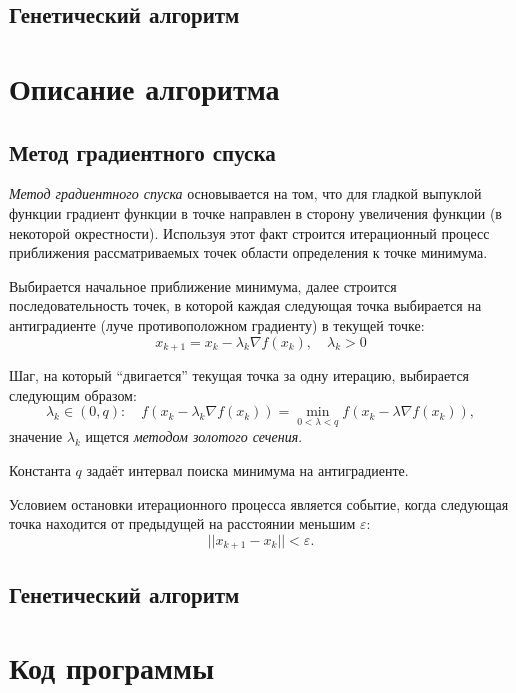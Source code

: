 \documentclass[10pt,a4paper,titlepage]{article}
\begin{document}
\subsection{Генетический алгоритм}


\section{Описание алгоритма}
\subsection{Метод градиентного спуска}

\textit{Метод градиентного спуска} основывается на том, что для гладкой выпуклой функции градиент функции в точке направлен
в сторону увеличения функции (в некоторой окрестности).
Используя этот факт строится итерационный процесс приближения рассматриваемых точек области определения 
к точке минимума.

Выбирается начальное приближение минимума, далее строится последовательность точек,
в которой каждая следующая точка выбирается на антиградиенте (луче противоположном градиенту) в текущей точке:
$$ x_{k+1} = x_k - \lambda_k \nabla f(x_k), \quad \lambda_k > 0 $$

Шаг, на который ``двигается'' текущая точка за одну итерацию, выбирается следующим образом:
$$
  \lambda_k \in (0, q)\!: 
    \quad f(x_k - \lambda_k \nabla f(x_k)) = \min\limits_{0 < \lambda < q} f(x_k - \lambda \nabla f(x_k)),
$$
значение $\lambda_k$ ищется \textit{методом золотого сечения}.

Константа $q$ задаёт интервал поиска минимума на антиградиенте.

Условием остановки итерационного процесса является событие, когда следующая точка находится от предыдущей 
на расстоянии меньшим $\varepsilon$:
$$ || x_{k+1} - x_k || < \varepsilon. $$ %


\subsection{Генетический алгоритм}

\section{Код программы}
\end{document}
